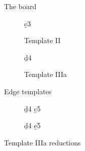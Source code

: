 


\begin{figure}[!htb]
\centering
\begin{board}{13}
\drawFullBoard
\end{board}
\caption{The board}
\end{figure}

\begin{figure}[!htb]
\centering
\begin{board}{13}{}

\end{board}
\caption{}
\label{fig:j9_opening_cont2}
\end{figure}

\begin{figure}[!htb]
\centering
\begin{subfigure}[b]{0.3\linewidth}
\centering
\begin{board}{4}
\b{c3}{\hexUpArrow}
\end{board}
\caption*{Template II}
\end{subfigure}
\begin{subfigure}[b]{0.3\linewidth}
\centering
\begin{board}{6}
\b{d4}{\hexUpArrow}
\end{board}
\caption*{Template IIIa}
\end{subfigure}
\caption{Edge templates}
\label{fig:edge_templates_simple}
\end{figure}

\begin{figure}[!htb]
\centering
\begin{subfigure}[b]{0.3\linewidth}
\centering
\begin{board}{6}
\b{d4}{\hexUpArrow}
\b{c5}{}
\end{board}
\end{subfigure}
\begin{subfigure}[b]{0.3\linewidth}
\centering
\begin{board}{6}
\b{d4}{\hexUpArrow}
\b{e5}{}
\end{board}
\end{subfigure}
\caption{Template IIIa reductions}
\label{fig:template_iiia_reductions}
\end{figure}


